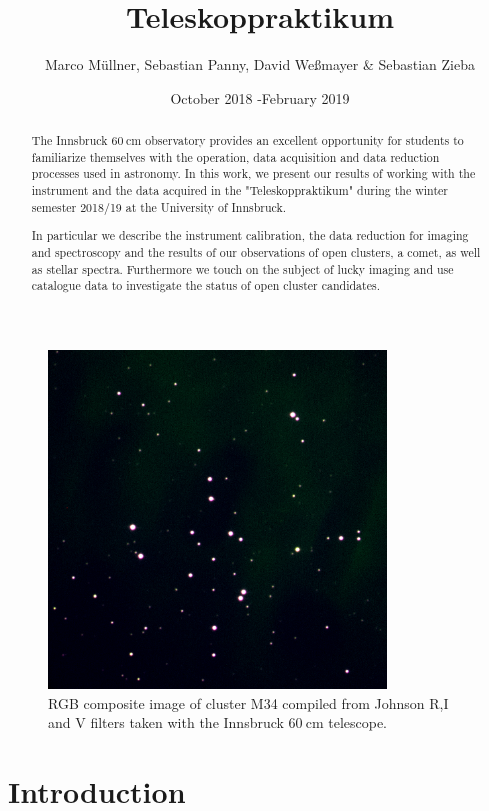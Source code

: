 \documentclass{article}
\title{Teleskoppraktikum}
\author{Marco Müllner, Sebastian Panny, David Weßmayer \& Sebastian Zieba}
\date{October 2018 {-}February 2019}
\begin{document}
\maketitle

\begin{figure}[H]
    \centering
    \includegraphics[width=0.8\textwidth,angle=-90]{Cluster/RGB_M34.png}
    \caption{RGB composite image of cluster M34 compiled from Johnson R,I and V filters taken with the Innsbruck $\SI{60}{\cm}$ telescope.}
    \label{fig:title} 
\end{figure}

\begin{abstract}
The Innsbruck $\SI{60}{\cm}$ observatory provides an excellent opportunity for students to familiarize themselves with the operation, data acquisition and data reduction processes used in astronomy. In this work, we present our results of working with the instrument and the data acquired in the "Teleskoppraktikum" during the winter semester 2018/19 at the University of Innsbruck.

In particular we describe the instrument calibration, the data reduction for imaging and spectroscopy and the results of our observations of open clusters, a comet, as well as stellar spectra. Furthermore we touch on the subject of lucky imaging and use catalogue data to investigate the status of open cluster candidates. 
\end{abstract}

\newpage
\tableofcontents

\newpage
\section{Introduction}
\end{document}
